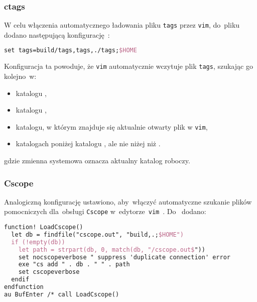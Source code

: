 \documentclass[thesis]{subfiles}
\begin{document}


\subsubsection{ctags}

W celu włączenia automatycznego ładowania pliku \texttt{tags} przez \texttt{vim}, do~pliku \mbox{} dodano następującą konfigurację~\cite{ctags,ctags-tricks}:
\begin{lstlisting}[language=tex,numbers=none,caption={Konfiguracja \texttt{ctags} w~pliku \texttt{.vimrc}}]
set tags=build/tags,tags,./tags;$HOME
\end{lstlisting}
Konfiguracja ta powoduje, że \texttt{vim} automatycznie wczytuje plik \texttt{tags}, szukając go kolejno~w:
\begin{itemize}[font=\ttfamily]
	\item katalogu ,
	\item katalogu ,
	\item katalogu, w którym znajduje się aktualnie otwarty plik w \texttt{vim},
	\item katalogach poniżej katalogu , ale nie niżej niż .
\end{itemize}
gdzie zmienna systemowa  oznacza aktualny katalog roboczy.


\subsubsection{Cscope}

Analogiczną konfigurację ustawiono, aby~włączyć automatyczne szukanie plików pomocniczych dla~obsługi \texttt{Cscope} w~edytorze~\texttt{vim}~\cite{cscope,cscope-autoload}. Do~ dodano:
\begin{lstlisting}[language=tex,numbers=none,caption={Konfiguracja \texttt{Cscope} w~pliku \texttt{.vimrc}}]
function! LoadCscope()
  let db = findfile("cscope.out", "build,.;$HOME")
  if (!empty(db))
    let path = strpart(db, 0, match(db, "/cscope.out$"))
    set nocscopeverbose " suppress 'duplicate connection' error
    exe "cs add " . db . " " . path
    set cscopeverbose
  endif
endfunction
au BufEnter /* call LoadCscope()
\end{lstlisting}
\end{document}
